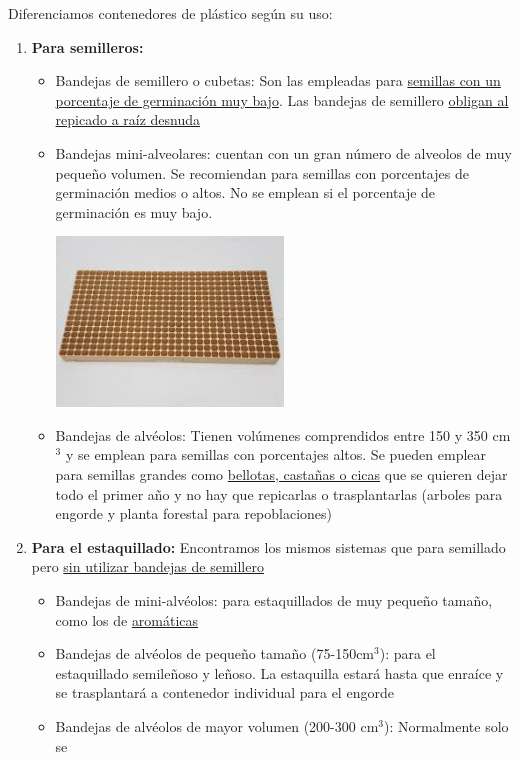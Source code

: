 \documentclass[a4paper,12pt,oneside]{article}
\begin{document}
\begin{enumerate}
Diferenciamos contenedores de plástico según su uso:
\begin{enumerate}
\item \textbf{Para semilleros:}
\begin{itemize}
\item Bandejas de semillero o cubetas: Son las empleadas para \uline{semillas con un
porcentaje de germinación muy bajo}. Las bandejas de semillero \uline{obligan al
repicado a raíz desnuda}
\item Bandejas mini-alveolares: cuentan con un gran número de alveolos de muy
pequeño volumen. Se recomiendan para semillas con porcentajes de
germinación medios o altos. No se emplean si el porcentaje de germinación
es muy bajo.
\begin{center}
\includegraphics[width=0.5\textwidth]{./img_uf1596/bandeja_multi.jpg}
\end{center}
\item Bandejas de alvéolos: Tienen volúmenes comprendidos entre 150 y 350 cm\(^{\text{3}}\) y
se emplean para semillas con porcentajes altos. Se pueden emplear para
semillas grandes como \uline{bellotas, castañas o cicas} que se quieren dejar
todo el primer año y no hay que repicarlas o trasplantarlas (arboles para
engorde y planta forestal para repoblaciones)
\end{itemize}
\item \textbf{Para el estaquillado:} Encontramos los mismos sistemas que para semillado
pero \uline{sin utilizar bandejas de semillero}
\begin{itemize}
\item Bandejas de mini-alvéolos: para estaquillados de muy pequeño tamaño, como
los de \uline{aromáticas}
\item Bandejas de alvéolos de pequeño tamaño (75-150cm\(^{\text{3}}\)): para el estaquillado
semileñoso y leñoso. La estaquilla estará hasta que enraíce y se
trasplantará a contenedor individual para el engorde
\item Bandejas de alvéolos de mayor volumen (200-300 cm\(^{\text{3}}\)): Normalmente solo se

\end{itemize}
\end{enumerate}
\end{enumerate}
\end{document}

